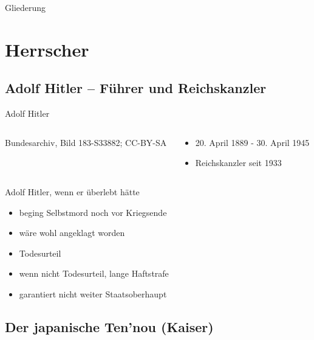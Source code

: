 

\begin{frame}
	 \titlepage
\end{frame}

\begin{frame}{Gliederung}
	\tableofcontents
\end{frame}

\section{Herrscher}

\subsection{Adolf Hitler -- Führer und Reichskanzler}

\begin{frame}{Adolf Hitler}
	\begin{columns}
		\begin{column}{0.6\textwidth}
				{Bundesarchiv, Bild 183-S33882; CC-BY-SA}
		\end{column}
		\begin{column}{0.39\textwidth}
			\begin{itemize}
				\item 20. April 1889 - 30. April 1945
				\item Reichskanzler seit 1933
			\end{itemize}
		\end{column}
	\end{columns}
\end{frame}


\begin{frame}{Adolf Hitler, wenn er überlebt hätte}
	\begin{itemize}
		\item beging Selbstmord noch vor Kriegsende
		\pause
		\item wäre wohl angeklagt worden
		\pause
		\item Todesurteil
		\pause
		\item wenn nicht Todesurteil, lange Haftstrafe
		\item garantiert nicht weiter Staatsoberhaupt
	\end{itemize}
\end{frame}

\subsection[Der Ten’nou]{Der japanische Ten’nou (Kaiser)}

